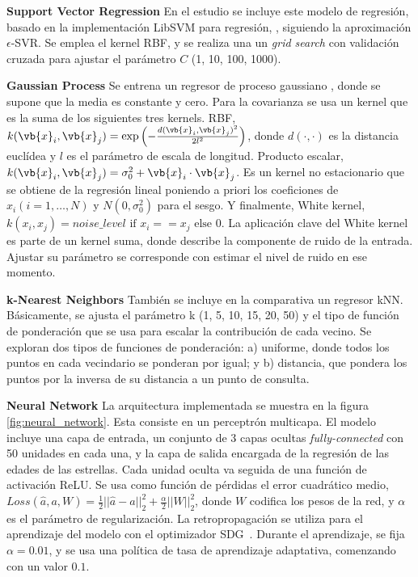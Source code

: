 \vspace{0.5cm}

\textbf{Support Vector Regression} {} En el estudio se incluye este modelo de regresión, basado en la implementación LibSVM para regresión, \cite{LIBSVM}, siguiendo la aproximación $\epsilon$-SVR. Se emplea el kernel RBF, y se realiza una un \emph{grid search} con validación cruzada para ajustar el parámetro $C$ (1, 10, 100, 1000).

\vspace{0.5cm}

\textbf{Gaussian Process} {} Se entrena un regresor de proceso gaussiano \cite{Rasmussen2006}, donde se supone que la media es constante y cero. Para la covarianza se usa un kernel que es la suma de los siguientes tres kernels. RBF, $k(\vb{x}_i, \vb{x}_j) = \text{exp}\left(- \frac{d(\vb{x}_i, \vb{x}_j)^2}{2l^2} \right)$, donde $d(\cdot, \cdot)$ es la distancia euclídea y $l$ es el parámetro de escala de longitud. Producto escalar, $k(\vb{x}_i, \vb{x}_j) = \sigma_0 ^ 2 + \vb{x}_i \cdot \vb{x}_j$. Es un kernel no estacionario que se obtiene de la regresión lineal poniendo a priori los coeficiones de $x_i (i = 1, \ldots, N)$ y  $N(0, \sigma_0^2)$ para el sesgo. Y finalmente, White kernel, $k(x_i, x_j) = noise\_level \text{ if } x_i == x_j \text{ else } 0$. La aplicación clave del White kernel es parte de un kernel suma, donde describe la componente de ruido de la entrada. Ajustar su parámetro se corresponde con estimar el nivel de ruido en ese momento.

\vspace{0.5cm}

\textbf{k-Nearest Neighbors} {} También se incluye en la comparativa un regresor kNN. Básicamente, se ajusta el parámetro k (1, 5, 10, 15, 20, 50) y el tipo de función de ponderación que se usa para escalar la contribución de cada vecino. Se exploran dos tipos de funciones de ponderación: a) uniforme, donde todos los puntos en cada vecindario se ponderan por igual; y b) distancia, que pondera los puntos por la inversa de su distancia a un punto de consulta.

\vspace{0.5cm}

\textbf{Neural Network} {} La arquitectura implementada se muestra en la figura \ref{fig:neural_network}. Esta consiste en un perceptrón multicapa. El modelo incluye una capa de entrada, un conjunto de 3 capas ocultas \emph{fully-connected} con 50 unidades en cada una, y la capa de salida encargada de la regresión de las edades de las estrellas. Cada unidad oculta va seguida de una función de activación ReLU. Se usa como función de pérdidas el error cuadrático medio, $Loss(\hat{a},a,W) = \frac{1}{2}||\hat{a} - a ||_2^2 + \frac{\alpha}{2} ||W||_2^2$, donde $W$ codifica los pesos de la red, y $\alpha$ es el parámetro de regularización. La retropropagación \cite{LeCun2012} se utiliza para el aprendizaje del modelo con el optimizador SDG~\cite{sgd}. Durante el aprendizaje, se fija $\alpha=0.01$, y se usa una política de tasa de aprendizaje adaptativa, comenzando con un valor $0.1$.

